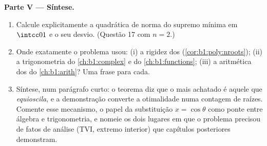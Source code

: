\begin{problem}
\medskip
\noindent\textbf{Parte V --- Síntese.}
\begin{enumerate}
  \item Calcule explicitamente a quadrática  de norma do supremo
        mínima em $\intcc01$ e o seu desvio. (Questão 17
        com $n = 2$.)
  \item Onde exatamente o problema usou: (i) a rigidez dos
         (\cref{cor:b1:poly:nroots}); (ii) a
        trigonometria do \cref{ch:b1:complex} e do
        \cref{ch:b1:functions}; (iii) a aritmética dos  do \cref{ch:b1:arith}? Uma frase para cada.
  \item Síntese, num parágrafo curto: o teorema diz que
        o  mais achatado é aquele que
        \emph{equioscila}, e a demonstração converte a otimalidade
        numa contagem de raízes. Comente esse mecanismo, o
        papel da substituição $x = \cos\theta$ como ponte
        entre álgebra e trigonometria, e nomeie os dois
        lugares em que o problema precisou de fatos de análise (TVI,
        extremo interior) que capítulos posteriores demonstram.
\end{enumerate}
\end{problem}
